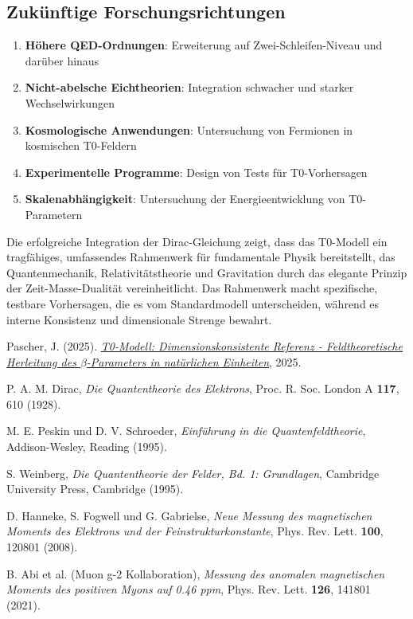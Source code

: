 \documentclass[12pt,a4paper]{article}
\begin{document}
\subsection{Zukünftige Forschungsrichtungen}
\label{subsec:zukunftsforschung}

\begin{enumerate}
	\item \textbf{Höhere QED-Ordnungen}: Erweiterung auf Zwei-Schleifen-Niveau und darüber hinaus
	\item \textbf{Nicht-abelsche Eichtheorien}: Integration schwacher und starker Wechselwirkungen
	\item \textbf{Kosmologische Anwendungen}: Untersuchung von Fermionen in kosmischen T0-Feldern
	\item \textbf{Experimentelle Programme}: Design von Tests für T0-Vorhersagen
	\item \textbf{Skalenabhängigkeit}: Untersuchung der Energieentwicklung von T0-Parametern
\end{enumerate}

Die erfolgreiche Integration der Dirac-Gleichung zeigt, dass das T0-Modell ein tragfähiges, umfassendes Rahmenwerk für fundamentale Physik bereitstellt, das Quantenmechanik, Relativitätstheorie und Gravitation durch das elegante Prinzip der Zeit-Masse-Dualität vereinheitlicht. Das Rahmenwerk macht spezifische, testbare Vorhersagen, die es vom Standardmodell unterscheiden, während es interne Konsistenz und dimensionale Strenge bewahrt.

\begin{thebibliography}{9}
	Pascher, J. (2025). \href{https://github.com/jpascher/T0-Time-Mass-Duality/blob/main/2/pdf/DerivationVonBetaEn.pdf}{\textit{T0-Modell: Dimensionskonsistente Referenz - Feldtheoretische Herleitung des $\beta$-Parameters in natürlichen Einheiten}}, 2025.
	
	P. A. M. Dirac,
	\textit{Die Quantentheorie des Elektrons},
	Proc. R. Soc. London A \textbf{117}, 610 (1928).
	
	M. E. Peskin und D. V. Schroeder,
	\textit{Einführung in die Quantenfeldtheorie},
	Addison-Wesley, Reading (1995).
	
	S. Weinberg,
	\textit{Die Quantentheorie der Felder, Bd. 1: Grundlagen},
	Cambridge University Press, Cambridge (1995).
	
	D. Hanneke, S. Fogwell und G. Gabrielse,
	\textit{Neue Messung des magnetischen Moments des Elektrons und der Feinstrukturkonstante},
	Phys. Rev. Lett. \textbf{100}, 120801 (2008).
	
	B. Abi et al. (Muon g-2 Kollaboration),
	\textit{Messung des anomalen magnetischen Moments des positiven Myons auf 0.46 ppm},
	Phys. Rev. Lett. \textbf{126}, 141801 (2021).
\end{thebibliography}
\end{document}
